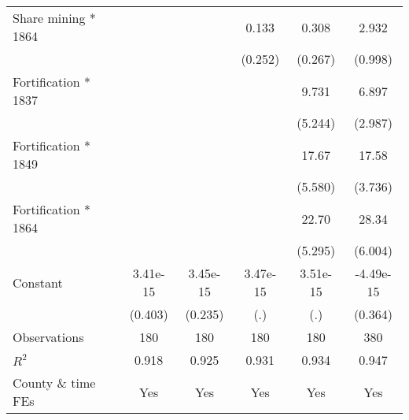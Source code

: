 {\begin{tabular}{l*{5}{c}}
Share mining * 1864 &                     &                     &       0.133         &       0.308         &       2.932\sym{***}\\
                    &                     &                     &     (0.252)         &     (0.267)         &     (0.998)         \\
Fortification * 1837&                     &                     &                     &       9.731\sym{*}  &       6.897\sym{**} \\
                    &                     &                     &                     &     (5.244)         &     (2.987)         \\
Fortification * 1849&                     &                     &                     &       17.67\sym{***}&       17.58\sym{***}\\
                    &                     &                     &                     &     (5.580)         &     (3.736)         \\
Fortification * 1864&                     &                     &                     &       22.70\sym{***}&       28.34\sym{***}\\
                    &                     &                     &                     &     (5.295)         &     (6.004)         \\
Constant            &    3.41e-15         &    3.45e-15         &    3.47e-15         &    3.51e-15         &   -4.49e-15         \\
                    &     (0.403)         &     (0.235)         &         (.)         &         (.)         &     (0.364)         \\
\hline
Observations        &         180         &         180         &         180         &         180         &         380         \\
\(R^{2}\)           &       0.918         &       0.925         &       0.931         &       0.934         &       0.947         \\
County \& time FEs  &         Yes         &         Yes         &         Yes         &         Yes         &         Yes         \\
\hline\hline
\end{tabular}
}

